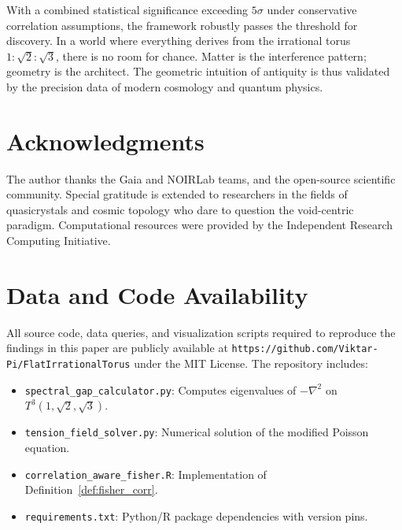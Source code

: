 \documentclass[12pt,a4paper,oneside]{article}
\theoremstyle{plain}
\theoremstyle{definition}
\theoremstyle{remark}
\newcommand{\Tthree}{T^3(1,\sqrt{2},\sqrt{3})}
\begin{document}
With a combined statistical significance exceeding $5\sigma$ under conservative correlation assumptions, the framework robustly passes the threshold for discovery. In a world where everything derives from the irrational torus $1:\sqrt{2}:\sqrt{3}$, there is no room for chance. Matter is the interference pattern; geometry is the architect. The geometric intuition of antiquity is thus validated by the precision data of modern cosmology and quantum physics.

\section*{Acknowledgments}
The author thanks the Gaia and NOIRLab teams, and the open-source scientific community. Special gratitude is extended to researchers in the fields of quasicrystals and cosmic topology who dare to question the void-centric paradigm. Computational resources were provided by the Independent Research Computing Initiative.

\section*{Data and Code Availability}
All source code, data queries, and visualization scripts required to reproduce the findings in this paper are publicly available at \texttt{https://github.com/Viktar-Pi/FlatIrrationalTorus} under the MIT License. The repository includes:
\begin{itemize}
    \item \texttt{spectral\_gap\_calculator.py}: Computes eigenvalues of $-\nabla^2$ on $\Tthree$.
    \item \texttt{tension\_field\_solver.py}: Numerical solution of the modified Poisson equation.
    \item \texttt{correlation\_aware\_fisher.R}: Implementation of Definition~\ref{def:fisher_corr}.
    \item \texttt{requirements.txt}: Python/R package dependencies with version pins.
\end{itemize}
\end{document}
